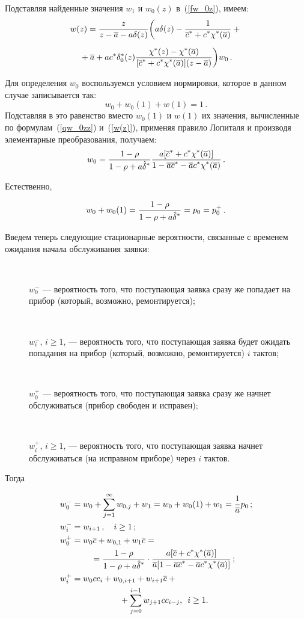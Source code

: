 \begin{multicols}{2}
Подставляя найденные значения $w_{1}$ и $w_0(z)$ в~(\ref{fw_0z}), имеем:
\begin{multline}
\label{w(z)}
w(z)= \displaystyle\frac{\displaystyle z\mathstrut}{\displaystyle  z - \overline a - a \delta(z)\mathstrut}
\bigg(
a \delta(z) - \displaystyle\frac{\displaystyle 1\mathstrut}{\displaystyle \overline c^* + c^* \chi^*(\overline a)\mathstrut} + {}\\[6pt]
{}+\overline a + a c^* \delta^{*}_0(z) \displaystyle\frac{\displaystyle \chi^*(z) - \chi^*(\overline a)
\mathstrut}{\displaystyle [\overline c^* + c^* \chi^*(\overline a)] (z - \overline a) \mathstrut}
\bigg) w_0\,.
\end{multline}

Для определения $w_0$ воспользуемся условием нормировки,
которое в данном случае записывается так:
$$
w_0 + w_0(1) + w(1) = 1\,.
$$
Подставляя в это равенство вместо $w_{0}(1)$ и $w(1)$
их значения, вычисленные по формулам~(\ref{qw_0zz}) и~(\ref{w(z)}),
применяя правило Лопиталя и производя элементарные преобразования, получаем:
$$
w_0 = \displaystyle\frac{\displaystyle 1 - \rho \mathstrut}{\displaystyle 1 - \rho + a \hat \delta^*\mathstrut}
\displaystyle\frac{\displaystyle  a [\overline c^* + c^* \chi^*(\overline a)] \mathstrut}{\displaystyle 1 - \overline a \overline c^* - \overline a c^* \chi^*(\overline a)\mathstrut}\,.
$$

Естественно,

\noindent
$$
w_0 + w_{0}(1) = \displaystyle\frac{\displaystyle 1 - \rho \mathstrut}{\displaystyle 1 - \rho + a \hat \delta^*\mathstrut} = p_0 = p_0^+ \,.
$$

Введем теперь следующие стационарные вероятности, связанные
с временем ожидания начала обслуживания заявки:
\begin{description}
\item[\,] $w_0^-$ --- вероятность того, что по\-сту\-па\-ющая заявка сразу
же попадает на прибор (который, возможно, ремонтируется);
\item[\,]
$w_{i}^-$, $i\ge1$, --- вероятность того, что по\-сту\-па\-ющая
заявка будет ожидать попадания на прибор (который, возможно,
ремонтируется) $i$ тактов;
\item[\,]
$w_0^+$ --- вероятность того, что по\-сту\-па\-ющая заявка сразу
же начнет обслуживаться (прибор свободен и исправен);
\item[\,]
$w_{i}^+$, $i\ge1$, --- вероятность того, что по\-сту\-па\-ющая
заявка начнет обслуживаться (на исправном приборе) через $i$
тактов.
\end{description}

Тогда

\noindent
\begin{align*}
w_0^- &= w_0 + \sum_{j=1}^\infty w_{0,j} + w_1 = w_0 + w_{0}(1) + w_1 = \fr{1 }{\a} p_0\,;
\\
w_i^-&= w_{i+1}\,, \quad i\ge 1\,;
\\
w_0^+&= w_0 \oc + w_{0,1} + w_1 \oc = {}\\
&\hspace*{8mm}{}=\fr{1 - \rho}{1 - \rho + a \hd^*} \cdot
\fr{a [\oc + c^* \chi^*(\a)] }{\a[1 - \a \oc^* - \a c^* \chi^*(\a)]}\,;
\\
w_i^+ &= w_0 c c_i + w_{0,i+1} + w_{i+1} \oc + {}\\
&\hspace*{20mm}{}+\sum_{j=0}^{i-1} w_{j+1} c c_{i-j},
\enskip i\ge 1.
\end{align*}


\end{multicols}
